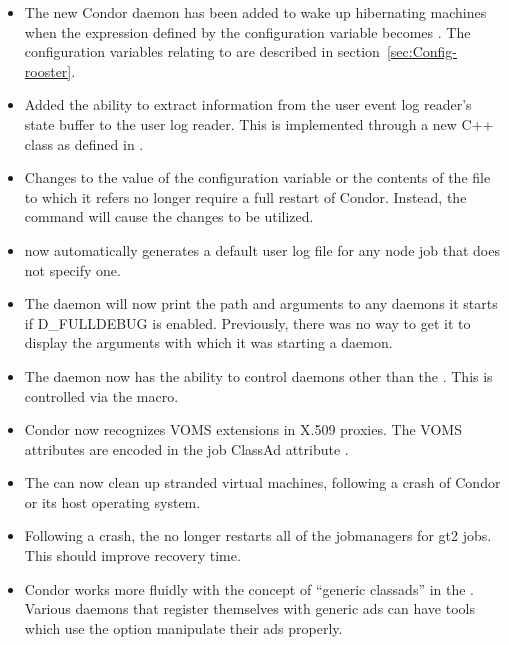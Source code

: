 \begin{itemize}
\item The new Condor daemon  has been added to wake up
hibernating machines when the expression defined by the configuration variable
 becomes .
The configuration variables relating to 
are described in section~\ref{sec:Config-rooster}.

\item Added the ability to extract information from the user event log
  reader's state buffer to the user log reader.  This is implemented
  through a new  C++ class
  as defined in .

\item Changes to the value of the configuration variable
 or the contents
of the file to which it refers no longer require a full restart of Condor.
Instead, the command  will cause the changes to be utilized.

\item {} now automatically generates a default user log
file for any node job that does not specify one.

\item The  daemon will now print the path and arguments
  to any daemons it starts if D\_FULLDEBUG is enabled.  Previously,
  there was no way to get it to display the arguments with which it
  was starting a daemon.

\item The  daemon now has the ability to control daemons
  other than the .  This is controlled via the
   macro.

\item Condor now recognizes VOMS extensions in X.509 proxies.
The VOMS attributes are encoded in the job ClassAd attribute
.

\item The  can now clean up stranded virtual machines,
following a crash of Condor or its host operating system.

\item Following a crash, the  no longer restarts all
of the jobmanagers for gt2 jobs. This should improve recovery time.

\item Condor works more fluidly with the concept of ``generic classads'' in
the . Various daemons that register themselves with 
generic ads can have tools which use the  option manipulate
their ads properly.

\end{itemize}

